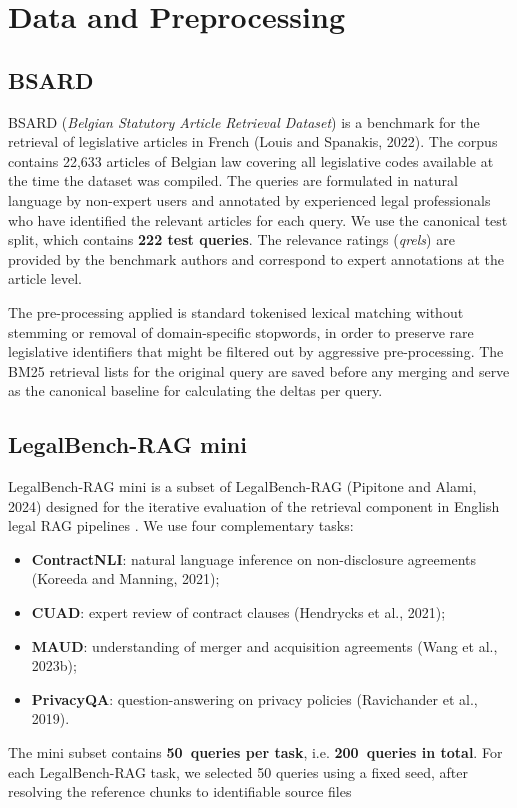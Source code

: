 \documentclass[a4paper,fleqn]{cas-dc}
\begin{document}
\section{Data and Preprocessing}
\subsection{BSARD}
BSARD (\textit{Belgian Statutory Article Retrieval Dataset}) is a 
benchmark for the retrieval of legislative articles in French 
(Louis and Spanakis, 2022). The corpus contains 22,633 articles of 
Belgian law covering all legislative codes available 
at the time the dataset was compiled. The queries are formulated 
in natural language by non-expert users and annotated by 
experienced legal professionals who have identified the relevant articles 
for each query.
We use the canonical test split, which contains 
\textbf{222 test queries}. The relevance ratings 
(\textit{qrels}) are provided by the benchmark authors and 
correspond to expert annotations at the article level.
 
The pre-processing applied is standard tokenised lexical matching 
without stemming or removal of domain-specific stopwords, 
in order to preserve rare legislative identifiers that 
might be filtered out by aggressive pre-processing. The 
BM25 retrieval lists for the original query are saved 
before any merging and serve as the canonical baseline for calculating 
the deltas per query.
\subsection{LegalBench-RAG mini}
LegalBench-RAG mini is a subset of LegalBench-RAG 
(Pipitone and Alami, 2024) designed for the iterative evaluation of the 
retrieval component in English legal RAG pipelines
. We use four complementary tasks:
\begin{itemize}
    
\item \textbf{ContractNLI}: natural language inference on 
    non-disclosure agreements (Koreeda and Manning, 2021);
    \item \textbf{CUAD}: expert review of contract clauses 
    (Hendrycks et al., 2021);
    
\item \textbf{MAUD}: understanding of 
    merger and acquisition agreements (Wang et al., 2023b);
    \item \textbf{PrivacyQA}: question-answering on 
    privacy policies (Ravichander et al., 2019).
\end{itemize}
The mini subset contains \textbf{50~queries per task}, i.e. 
\textbf{200~queries in total}. For each LegalBench-RAG task, 
we selected 50 queries using a fixed seed, after 
resolving the reference chunks to identifiable source files
\end{document}
